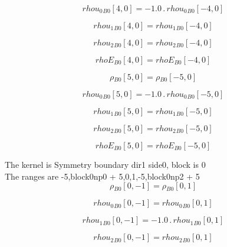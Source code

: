 \documentclass{article}
\begin{document}
\begin{dmath}{rhou_{0}{_{B0}}}[{4,0}] = - 1.0 \,.\, {rhou_{0}{_{B0}}}[{-4,0}]\end{dmath}

\begin{dmath}{rhou_{1}{_{B0}}}[{4,0}] = {rhou_{1}{_{B0}}}[{-4,0}]\end{dmath}

\begin{dmath}{rhou_{2}{_{B0}}}[{4,0}] = {rhou_{2}{_{B0}}}[{-4,0}]\end{dmath}

\begin{dmath}{rhoE{_{B0}}}[{4,0}] = {rhoE{_{B0}}}[{-4,0}]\end{dmath}

\begin{dmath}{\rho{_{B0}}}[{5,0}] = {\rho{_{B0}}}[{-5,0}]\end{dmath}

\begin{dmath}{rhou_{0}{_{B0}}}[{5,0}] = - 1.0 \,.\, {rhou_{0}{_{B0}}}[{-5,0}]\end{dmath}

\begin{dmath}{rhou_{1}{_{B0}}}[{5,0}] = {rhou_{1}{_{B0}}}[{-5,0}]\end{dmath}

\begin{dmath}{rhou_{2}{_{B0}}}[{5,0}] = {rhou_{2}{_{B0}}}[{-5,0}]\end{dmath}

\begin{dmath}{rhoE{_{B0}}}[{5,0}] = {rhoE{_{B0}}}[{-5,0}]\end{dmath}

\noindent The kernel is Symmetry boundary dir1 side0, block is 0\\\noindent The ranges are -5,block0np0 + 5,0,1,-5,block0np2 + 5\\\begin{dmath}{\rho{_{B0}}}[{0,-1}] = {\rho{_{B0}}}[{0,1}]\end{dmath}

\begin{dmath}{rhou_{0}{_{B0}}}[{0,-1}] = {rhou_{0}{_{B0}}}[{0,1}]\end{dmath}

\begin{dmath}{rhou_{1}{_{B0}}}[{0,-1}] = - 1.0 \,.\, {rhou_{1}{_{B0}}}[{0,1}]\end{dmath}

\begin{dmath}{rhou_{2}{_{B0}}}[{0,-1}] = {rhou_{2}{_{B0}}}[{0,1}]\end{dmath}
\end{document}
